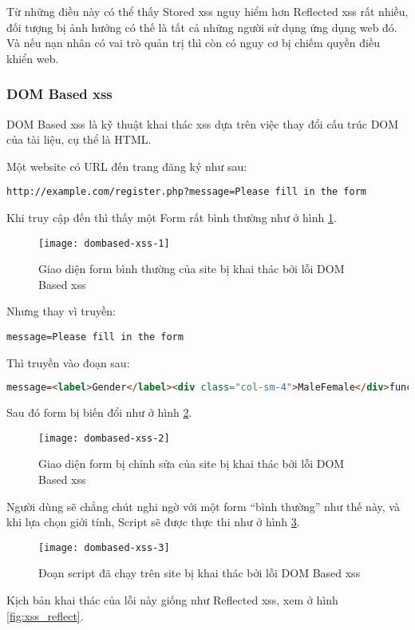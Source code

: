 \documentclass[../main-report.tex]{subfiles}
\begin{document}
Từ những điều này có thể thấy Stored \acrshort{xss} nguy hiểm hơn Reflected \acrshort{xss} rất nhiều, đối tượng bị ảnh hưởng có thế là tất cả những người sử dụng ứng dụng web đó. Và nếu nạn nhân có vai trò quản trị thì còn có nguy cơ bị chiếm quyền điều khiển web.

\subsubsection*{DOM Based \acrshort{xss}}
DOM Based \acrshort{xss} là kỹ thuật khai thác \acrshort{xss} dựa trên việc thay đổi cấu trúc DOM của tài liệu, cụ thể là HTML. 

\begin{example}
Một website có URL đến trang đăng ký như sau:

\begin{lstlisting}
http://example.com/register.php?message=Please fill in the form
\end{lstlisting}
\end{example}

Khi truy cập đến thì thấy một Form rất bình thường như ở hình \ref{fig:xss_dombased_1}.

\begin{figure}[ht!]
\centering\texttt{[image: dombased-xss-1]}
\caption{Giao diện form bình thường của site bị khai thác bởi lỗi DOM Based \acrshort{xss}}
\label{fig:xss_dombased_1}
\end{figure}

Nhưng thay vì truyền:

\begin{lstlisting}
message=Please fill in the form
\end{lstlisting}

Thì truyền vào đoạn sau:

\begin{lstlisting}[language=HTML]
message=<label>Gender</label><div class="col-sm-4">MaleFemale</div>function show(){alert();}
\end{lstlisting}

Sau đó form bị biến đổi như ở hình \ref{fig:xss_dombased_2}.

\begin{figure}[ht!]
\centering\texttt{[image: dombased-xss-2]}
\caption{Giao diện form bị chỉnh sửa của site bị khai thác bởi lỗi DOM Based \acrshort{xss}}
\label{fig:xss_dombased_2}
\end{figure}

Người dùng sẽ chẳng chút nghi ngờ với một form ``bình thường'' như thế này, và khi lựa chọn giới tính, Script sẽ được thực thi như ở hình \ref{fig:xss_dombased_3}.

\begin{figure}[ht!]
\centering\texttt{[image: dombased-xss-3]}
\caption{Đoạn script đã chạy trên site bị khai thác bởi lỗi DOM Based \acrshort{xss}}
\label{fig:xss_dombased_3}
\end{figure}

Kịch bản khai thác của lỗi này giống như Reflected \acrshort{xss}, xem ở hình \ref{fig:xss_reflect}.
\end{document}
